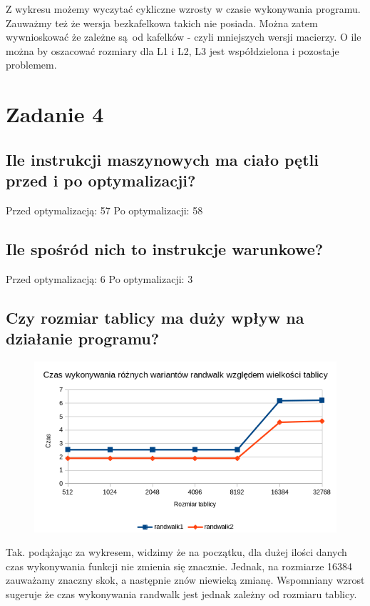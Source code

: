 \documentclass[a4paper,12pt]{mwart} %
\begin{document}
Z wykresu możemy wyczytać cykliczne wzrosty w czasie wykonywania programu. Zauważmy też że wersja bezkafelkowa takich nie posiada. Można zatem wywnioskować że zależne są od kafelków - czyli mniejszych wersji macierzy. O ile można by oszacować rozmiary dla L1 i L2, L3 jest współdzielona i pozostaje problemem.

\section*{Zadanie 4}


\subsection*{Ile instrukcji maszynowych ma ciało pętli przed i po optymalizacji?}

Przed optymalizacją: 57
Po optymalizacji: 58

\subsection*{Ile spośród nich to instrukcje warunkowe?}

Przed optymalizacją: 6
Po optymalizacji: 3

\subsection*{Czy rozmiar tablicy ma duży wpływ na działanie programu?}

\begin{figure}[h!]
  \includegraphics[width=\linewidth]{graphs/graph4.png}
\end{figure}


Tak. podążając za wykresem, widzimy że na początku, dla dużej ilości danych czas wykonywania funkcji nie zmienia się znacznie. Jednak, na rozmiarze 16384 zauważamy znaczny skok, a następnie znów niewieką zmianę. Wspomniany wzrost sugeruje że czas wykonywania randwalk jest jednak zależny od rozmiaru tablicy.
\end{document}
